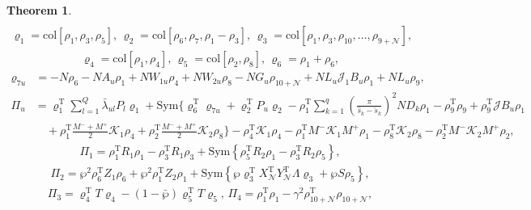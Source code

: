 \documentclass[preprint,review,fleqn,sort&compress,3p]{elsarticle}
\theoremstyle{definition}%
\newtheorem{thm}{Theorem}[section]
\begin{document}
\begin{thm}
\begin{align*}
	\end{align*}
	\begin{align*}
		\varrho_1=\text{col}\left[\rho_1,\rho_3,\rho_5\right],\, \varrho_2=\text{col}\left[\rho_6,\rho_7,\rho_1-\rho_3\right],\, \varrho_3=\text{col}\left[\rho_1,\rho_3,\rho_{10},\dots,\rho_{9+\mathcal{N}}\right],
	\end{align*}
	\begin{align*}
		\varrho_4 = \text{col}\left[\rho_1,\rho_4\right],\, \varrho_5=\text{col}\left[\rho_2,\rho_8\right],\, \varrho_6=\rho_1+\rho_6,
	\end{align*}
	\begin{align*}
		\varrho_{7u} &= -N \rho_6 - N A_u \rho_1 + N W_{1u} \rho_4 + N W_{2u} \rho_8 - N G_u \rho_{10+\mathcal{N}} + N L_u \mathcal{J}_1 B_u \rho_1 + N L_u \rho_{9},
	\end{align*}
	\begin{align*}
		\Pi_u &= \varrho_1^\text{T} \sum_{l=1}^{Q} \bar{\lambda}_{ul} P_l \varrho_1 + \text{Sym} \bigg\{\varrho_6^\text{T} \varrho_{7u} + \varrho_2^\text{T} P_u \varrho_2  - \rho_1^\text{T} \sum_{k=1}^{q} \left( \frac{\pi}{\hat{s}_k - \check{s}_k} \right)^2 N D_k \rho_1  - \rho_{9}^\text{T} \rho_{9} + \rho_{9}^\text{T} \mathcal{J} B_u \rho_1 \\&\quad+ \rho_1^\text{T} \frac{M^-+M^+}{2} \mathcal{K}_1 \rho_4 + \rho_2^\text{T} \frac{M^-+M^+}{2} \mathcal{K}_2 \rho_8\bigg\} - \rho_4^\text{T} \mathcal{K}_1 \rho_4 - \rho_1^\text{T} M^- \mathcal{K}_1 M^+ \rho_1  -  \rho_8^\text{T} \mathcal{K}_2 \rho_8 - \rho_2^\text{T} M^- \mathcal{K}_2 M^+ \rho_2, 
	\end{align*}
	\begin{align*}
		\Pi_1 = \rho_1^\text{T} R_1 \rho_1 - \rho_3^\text{T} R_1\rho_3 + \text{Sym}\! \left\{\rho_5^\text{T} R_2 \rho_1 - \rho_3^\text{T} R_2 \rho_5\right\},
	\end{align*}
	\begin{align*}
		\Pi_2 = \wp^2 \rho_6^\text{T} Z_1 \rho_6 + \wp^2 \rho_1^\text{T} Z_2 \rho_1 + \text{Sym}\! \left\{\wp  \varrho_3^\text{T} X_\mathcal{N}^\text{T} Y_\mathcal{N}^\text{T} \Lambda \varrho_3 + \wp S \rho_5 \right\},
	\end{align*}
	\begin{align*}
		\Pi_3 = \varrho_4^\text{T} T \varrho_4-(1-\bar{\wp})\varrho_5^\text{T} T \varrho_5, \, \Pi_4 = \rho_1^\text{T} \rho_1 - \gamma^2 \rho_{10+\mathcal{N}}^\text{T} \rho_{10+\mathcal{N}},
	\end{align*}
	\begin{align*}

\end{align*}
\end{thm}
\end{document}
